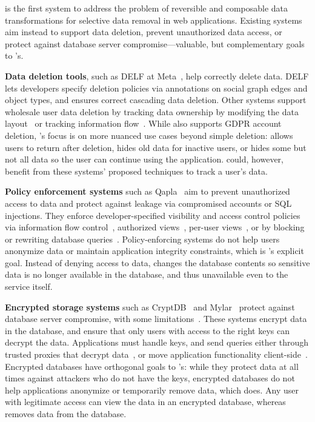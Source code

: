 \sys is the first system to address the problem of reversible and composable data
transformations for selective data removal in web applications.
%
Existing systems aim instead to support data deletion, prevent
unauthorized data access, or protect against database server
compromise---valuable, but complementary goals to \sys's.
%

\textbf{Data deletion tools}, such as DELF at
Meta~\cite{delf}, help correctly delete data.
%
DELF lets developers specify deletion policies via annotations on
social graph edges and object types, and ensures correct cascading data
deletion.
%
Other systems support wholesale user data deletion by tracking
data ownership by modifying the data layout~\cite{usershards, k9db} or
tracking information flow~\cite{schengendb}.
%
While \sys also supports GDPR account deletion, \sys's focus is on more nuanced
use cases beyond simple deletion: \sys allows users to return after deletion,
hides old data for inactive users, or hides some but not all data so the user
can continue using the application.
%
\sys could, however, benefit from these systems' proposed techniques to track a
user's data.
%

\textbf{Policy enforcement systems} such as Qapla~\cite{qapla} aim to prevent
unauthorized access to data and protect against leakage via compromised
accounts or SQL injections. They enforce developer-specified
visibility and access control policies via information flow
control~\cite{static, jeeves, jif, hails, ifdb}, authorized views~\cite{oracle},
per-user views~\cite{multiverse}, or by blocking or rewriting database
queries~\cite{blockaid, qapla, sieve}.
%
Policy-enforcing systems do not help users anonymize data or maintain
application integrity constraints, which is \sys's explicit
goal.
%
Instead of denying access to data, \sys changes the database contents so sensitive
data is no longer available in the database, and thus unavailable even to the
service itself.
%

\textbf{Encrypted storage systems} such as CryptDB~\cite{cryptdb} and
Mylar~\cite{mylar} protect against database server compromise, with some
limitations~\cite{grubbs}.
%
These systems encrypt data in the database, and
ensure that only users with access to the right keys can decrypt the data.
%
Applications must handle keys, and send queries
either through trusted proxies that decrypt data~\cite{cryptdb}, or move
application functionality client-side~\cite{mylar}.
%
Encrypted databases have orthogonal goals to \sys's: while they protect data at all times
against attackers who do not have the keys, encrypted databases do not help applications
anonymize or temporarily remove data, which \sys does.
%
Any user with legitimate access can view the data in an encrypted database,
whereas \sys removes \xxed data from the database.

